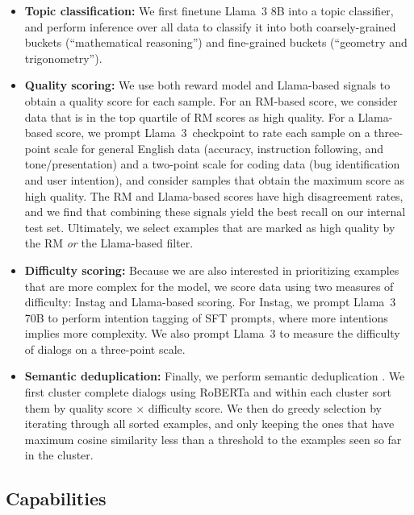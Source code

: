 \begin{itemize}
    \item \textbf{Topic classification:} We first finetune Llama~3 8B into a topic classifier, and perform inference over all data to classify it into both coarsely-grained buckets (``mathematical reasoning'') and fine-grained buckets (``geometry and trigonometry''). 

    \item \textbf{Quality scoring:} We use both reward model and Llama-based signals to obtain a quality score for each sample. For an RM-based score, we consider data that is in the top quartile of RM scores as high quality. For a Llama-based score, we prompt Llama~3~checkpoint to rate each sample on a three-point scale for general English data (accuracy, instruction following, and tone/presentation) and a two-point scale for coding data (bug identification and user intention), and consider samples that obtain the maximum score as high quality. The RM and Llama-based scores have high disagreement rates, and we find that combining these signals yield the best recall on our internal test set. Ultimately, we select examples that are marked as high quality by the RM \emph{or} the Llama-based filter. 

    \item \textbf{Difficulty scoring:} Because we are also interested in prioritizing examples that are more complex for the model, we score data using two measures of difficulty: Instag \citep{lu2023instag} and Llama-based scoring. For Instag, we prompt Llama~3 70B to perform intention tagging of SFT prompts, where more intentions implies more complexity. We also prompt Llama~3 to measure the difficulty \citep{liu2024makesgooddataalignment} of dialogs on a three-point scale. 

    \item \textbf{Semantic deduplication:} Finally, we perform semantic deduplication \citep{abbas2023semdedup, liu2024makesgooddataalignment}. We first cluster complete dialogs using RoBERTa \citep{liu_ott_roberta} and within each cluster sort them by quality score $\times$ difficulty score. We then do greedy selection by iterating through all sorted examples, and only keeping the ones that have maximum cosine similarity less than a threshold to the examples seen so far in the cluster.

\end{itemize}

\subsection{Capabilities}
\label{sec:Capabilities}

